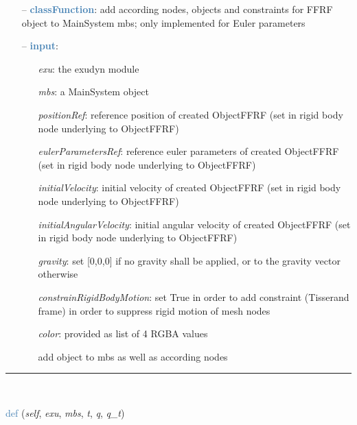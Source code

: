 \begin{itemize}[leftmargin=1.4cm]
\begin{itemize}[leftmargin=1.4cm]
\begin{itemize}[leftmargin=0.5cm]
\begin{itemize}[leftmargin=1.4cm]
\begin{itemize}[leftmargin=1.4cm]
\begin{itemize}[leftmargin=0.5cm]
\begin{flushleft}
\end{flushleft}
\setlength{\itemindent}{0.7cm}
\begin{itemize}[leftmargin=0.7cm]
\item[--]\textcolor{steelblue}{\bf classFunction}: add according nodes, objects and constraints for FFRF object to MainSystem mbs; only implemented for Euler parameters
\item[--]\textcolor{steelblue}{\bf input}: \vspace{-6pt}
\begin{itemize}[leftmargin=1.2cm]
\setlength{\itemindent}{-0.7cm}
\item[]{\it exu}: the exudyn module
\item[]{\it mbs}: a MainSystem object
\item[]{\it positionRef}: reference position of created ObjectFFRF (set in rigid body node underlying to ObjectFFRF)
\item[]{\it eulerParametersRef}: reference euler parameters of created ObjectFFRF (set in rigid body node underlying to ObjectFFRF)
\item[]{\it initialVelocity}: initial velocity of created ObjectFFRF (set in rigid body node underlying to ObjectFFRF)
\item[]{\it initialAngularVelocity}: initial angular velocity of created ObjectFFRF (set in rigid body node underlying to ObjectFFRF)
\item[]{\it gravity}: set [0,0,0] if no gravity shall be applied, or to the gravity vector otherwise
\item[]{\it constrainRigidBodyMotion}: set True in order to add constraint (Tisserand frame) in order to suppress rigid motion of mesh nodes
\item[]{\it color}: provided as list of 4 RGBA values
\item[]add object to mbs as well as according nodes
\end{itemize}
\vspace{12pt}\end{itemize}
%
\noindent\rule{8cm}{0.75pt}\vspace{1pt} \\ 
\begin{flushleft}
\noindent \textcolor{steelblue}{def {\bf {}}}\label{sec:FEM:ObjectFFRFinterface:UFforce}
({\it self}, {\it exu}, {\it mbs}, {\it t}, {\it q}, {\it q\_t})
\end{flushleft}
\setlength{\itemindent}{0.7cm}

\end{itemize}
\end{itemize}
\end{itemize}
\end{itemize}
\end{itemize}
\end{itemize}
